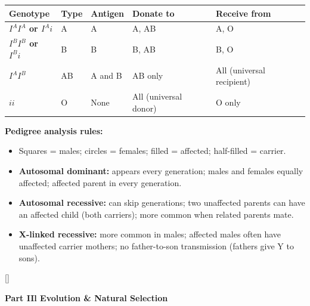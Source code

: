 \documentclass[11pt, letterpaper]{article}
\newcommand{\greensections}{%
  \titleformat{\section}{\large\bfseries\color{sectiongreen}}{}{0em}{}[\color{sectiongreen}\titlerule]%
  \titleformat{\subsection}{\normalsize\bfseries\color{sectiongreen!80!black}}{}{0em}{}%
}
\newcommand{\partbanner}[3]{%
  \begin{tcolorbox}[colback=#1, colframe=#2, boxrule=1.2pt, arc=4pt,
    left=8pt, right=8pt, top=6pt, bottom=6pt]
    \begin{center}{\LARGE\bfseries #3}\end{center}
  \end{tcolorbox}%
}
\begin{document}
\noindent
{\renewcommand{\arraystretch}{1.4}
\footnotesize\begin{tabularx}{\textwidth}{>{\bfseries\centering\arraybackslash}p{2.8cm}
                              >{\centering\arraybackslash}p{1.5cm}
                              >{\centering\arraybackslash}p{2.5cm}
                              >{\centering\arraybackslash}p{2.8cm}
                              >{\centering\arraybackslash}p{2.8cm}}
\toprule
\rowcolor{tableheaderpurple}
\textbf{Genotype} & \textbf{Type} & \textbf{Antigen} & \textbf{Donate to} & \textbf{Receive from} \\
\midrule
\rowcolor{rowPu} $I^A I^A$ or $I^A i$ & A & A & A, AB & A, O \\
\rowcolor{rowA}  $I^B I^B$ or $I^B i$ & B & B & B, AB & B, O \\
\rowcolor{rowPu} $I^A I^B$             & AB & A and B & AB only & All (universal recipient) \\
\rowcolor{rowA}  $ii$                  & O & None & All (universal donor) & O only \\
\bottomrule
\end{tabularx}}

\vspace{4pt}
\textbf{Pedigree analysis rules:}
\begin{itemize}[noitemsep]
  \item Squares = males; circles = females; filled = affected; half-filled = carrier.
  \item \textbf{Autosomal dominant:} appears every generation; males and females equally affected; affected parent in every generation.
  \item \textbf{Autosomal recessive:} can skip generations; two unaffected parents can have an affected child (both carriers); more common when related parents mate.
  \item \textbf{X-linked recessive:} more common in males; affected males often have unaffected carrier mothers; no father-to-son transmission (fathers give Y to sons).
\end{itemize}

\newpage

\greensections
{}
\partbanner{part2bg}{sectiongreen}{Part IIl \quad Evolution \& Natural Selection}
\end{document}
